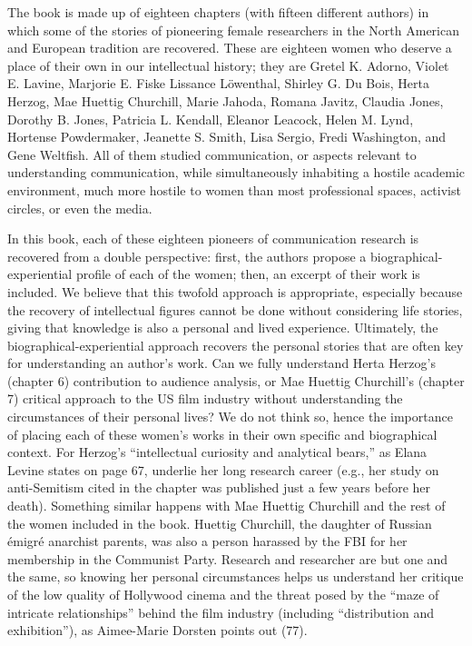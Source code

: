 \documentclass{tufte-handout}
\begin{document}
The book is made up of eighteen chapters (with fifteen different
authors) in which some of the stories of pioneering female researchers
in the North American and European tradition are recovered. These are
eighteen women who deserve a place of their own in our intellectual
history; they are Gretel K. Adorno, Violet E. Lavine, Marjorie E. Fiske
Lissance Löwenthal, Shirley G. Du Bois, Herta Herzog, Mae Huettig
Churchill, Marie Jahoda, Romana Javitz, Claudia Jones, Dorothy B. Jones,
Patricia L. Kendall, Eleanor Leacock, Helen M. Lynd, Hortense
Powdermaker, Jeanette S. Smith, Lisa Sergio, Fredi Washington, and Gene
Weltfish. All of them studied communication, or aspects relevant to
understanding communication, while simultaneously inhabiting a hostile
academic environment, much more hostile to women than most professional
spaces, activist circles, or even the media.

In this book, each of these eighteen pioneers of communication research
is recovered from a double perspective: first, the authors propose a
biographical-experiential profile of each of the women; then, an excerpt
of their work is included. We believe that this twofold approach is
appropriate, especially because the recovery of intellectual figures
cannot be done without considering life stories, giving that knowledge
is also a personal and lived experience. Ultimately, the
biographical-experiential approach recovers the personal stories that
are often key for understanding an author's work. Can we fully
understand Herta Herzog's (chapter 6) contribution to audience analysis,
or Mae Huettig Churchill's (chapter 7) critical approach to the US film
industry without understanding the circumstances of their personal
lives? We do not think so, hence the importance of placing each of these
women's works in their own specific and biographical context. For
Herzog's ``intellectual curiosity and analytical bears,'' as Elana
Levine states on page 67, underlie her long research career (e.g., her
study on anti-Semitism cited in the chapter was published just a few
years before her death). Something similar happens with Mae Huettig
Churchill and the rest of the women included in the book. Huettig
Churchill, the daughter of Russian émigré anarchist parents, was also a
person harassed by the FBI for her membership in the Communist Party.
Research and researcher are but one and the same, so knowing her
personal circumstances helps us understand her critique of the low
quality of Hollywood cinema and the threat posed by the ``maze of
intricate relationships'' behind the film industry (including
``distribution and exhibition''), as Aimee-Marie Dorsten points out
(77).
\end{document}
